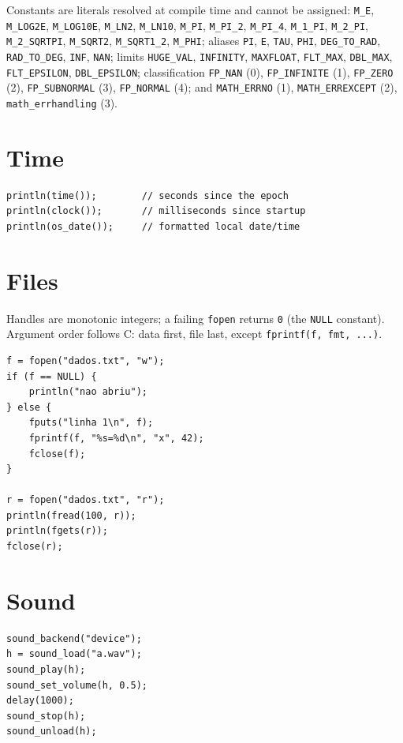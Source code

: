 \documentclass[11pt,a4paper,oneside]{report}
\newcommand{\code}[1]{\texttt{#1}}
\begin{document}
Constants are literals resolved at compile time and cannot be assigned: \code{M\_E}, \code{M\_LOG2E}, \code{M\_LOG10E}, \code{M\_LN2},
\code{M\_LN10}, \code{M\_PI}, \code{M\_PI\_2}, \code{M\_PI\_4},
\code{M\_1\_PI}, \code{M\_2\_PI}, \code{M\_2\_SQRTPI}, \code{M\_SQRT2},
\code{M\_SQRT1\_2}, \code{M\_PHI}; aliases \code{PI}, \code{E},
\code{TAU}, \code{PHI}, \code{DEG\_TO\_RAD}, \code{RAD\_TO\_DEG},
\code{INF}, \code{NAN}; limits \code{HUGE\_VAL}, \code{INFINITY},
\code{MAXFLOAT}, \code{FLT\_MAX}, \code{DBL\_MAX}, \code{FLT\_EPSILON},
\code{DBL\_EPSILON}; classification \code{FP\_NAN} (0),
\code{FP\_INFINITE} (1), \code{FP\_ZERO} (2), \code{FP\_SUBNORMAL} (3),
\code{FP\_NORMAL} (4); and \code{MATH\_ERRNO} (1),
\code{MATH\_ERREXCEPT} (2), \code{math\_errhandling} (3).

\section{Time}
\begin{lstlisting}
println(time());        // seconds since the epoch
println(clock());       // milliseconds since startup
println(os_date());     // formatted local date/time
\end{lstlisting}

\section{Files}
Handles are monotonic integers; a failing \code{fopen} returns \code{0}
(the \code{NULL} constant). Argument order follows C: data first, file
last, except \code{fprintf(f, fmt, ...)}.

\begin{lstlisting}
f = fopen("dados.txt", "w");
if (f == NULL) {
    println("nao abriu");
} else {
    fputs("linha 1\n", f);
    fprintf(f, "%s=%d\n", "x", 42);
    fclose(f);
}

r = fopen("dados.txt", "r");
println(fread(100, r));
println(fgets(r));
fclose(r);
\end{lstlisting}

\section{Sound}
\begin{lstlisting}
sound_backend("device");
h = sound_load("a.wav");
sound_play(h);
sound_set_volume(h, 0.5);
delay(1000);
sound_stop(h);
sound_unload(h);
\end{lstlisting}
\end{document}

